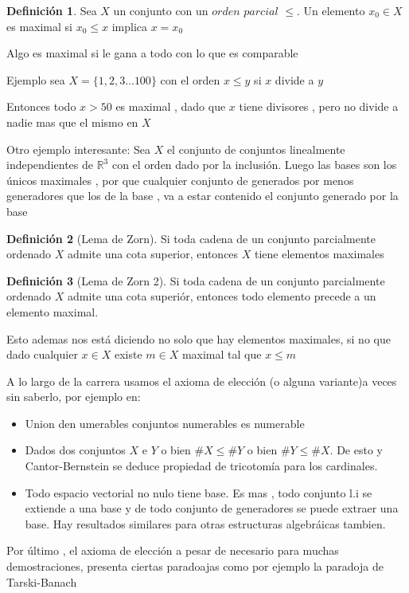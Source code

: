 \documentclass[12pt]{article}
\newcommand{\R}{\mathbb{R}}
\theoremstyle{definition}
\newtheorem{definition}{Definición}[section]
\begin{document}
\begin{definition}
  Sea $X$ un conjunto con un $orden$ $parcial$ $\leq$. Un elemento $x_{0} \in X$ es maximal si $x_{0} \leq x$ implica $x = x_{0}$
  
  Algo es maximal si le gana a todo con lo que es comparable

  Ejemplo sea $X = \{1,2,3 \dots 100\}$ con el orden $x \leq y$ si $x$ divide a $y$

  Entonces todo $x > 50$ es maximal , dado que $x$ tiene divisores , pero no divide a nadie mas que el mismo en $X$

  Otro ejemplo interesante: Sea $X$ el conjunto de conjuntos linealmente independientes de $\R^3$ con el orden dado por la inclusión. Luego las bases son los únicos maximales , por que cualquier conjunto de generados por menos generadores que los de la base , va a estar contenido el conjunto generado por la base
\end{definition}

\begin{definition}[Lema de Zorn]
  Si toda cadena de un conjunto parcialmente ordenado $X$ admite una cota superior, entonces $X$ tiene elementos maximales 
\end{definition}

\begin{definition}[Lema de Zorn 2]
  Si toda cadena de un conjunto parcialmente ordenado $X$ admite una cota superiór, entonces todo elemento precede a un elemento maximal.

Esto ademas nos está diciendo no solo que hay elementos maximales, si no que dado cualquier $x \in X$ existe $m \in X$ maximal tal que $x \leq m$
\end{definition}

A lo largo de la carrera usamos el axioma de elección (o alguna variante)a veces sin saberlo, por ejemplo en:
\begin{itemize}
  \item Union den umerables conjuntos numerables es numerable
  \item Dados dos conjuntos $X$ e $Y$ o bien $\# X \leq \# Y$ o bien $\# Y \leq \# X$. De esto y Cantor-Bernstein se deduce propiedad de tricotomía para los cardinales.
  \item Todo espacio vectorial no nulo tiene base. Es mas , todo conjunto l.i se extiende a una base y de todo conjunto de generadores se puede extraer una base. Hay resultados similares para otras estructuras algebráicas tambien.
  \end{itemize}

  Por último , el axioma de elección a pesar de necesario para muchas demostraciones, presenta ciertas paradoajas como por ejemplo la paradoja de Tarski-Banach
\end{document}
